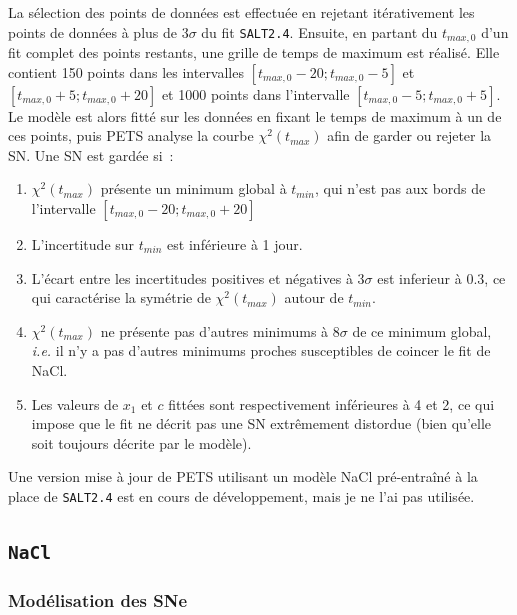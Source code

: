 \documentclass{book}
\def\nacl{\texttt{NaCl}\xspace}
\def\saltd{\texttt{SALT2.4}\xspace}
\begin{document}
La sélection des points de données est effectuée en rejetant itérativement les points de données à plus de 3$\sigma$ du fit \saltd. Ensuite, en partant du $t_{max, 0}$ d'un fit complet des points restants, une grille de temps de maximum est réalisé. Elle contient 150 points dans les intervalles $[t_{max, 0} - 20 ; t_{max, 0} - 5]$ et $[t_{max, 0} +5; t_{max, 0} + 20]$ et 1000 points dans l'intervalle $[t_{max, 0} - 5 ; t_{max, 0} + 5]$. Le modèle est alors fitté sur les données en fixant le temps de maximum à un de ces points, puis PETS analyse la courbe $\chi^2(t_{max})$ afin de garder ou rejeter la SN. Une SN est gardée si~:
\begin{enumerate}
\item $\chi^2(t_{max})$ présente un minimum global à $t_{min}$, qui n'est pas aux bords de l'intervalle $[t_{max,0} - 20 ; t_{max, 0} + 20]$
\item L'incertitude sur $t_{min}$ est inférieure à 1 jour.
\item L'écart entre les incertitudes positives et négatives à 3$\sigma$ est inferieur à $0.3$, ce qui caractérise la symétrie de $\chi^2(t_{max})$ autour de $t_{min}$.
\item $\chi^2(t_{max})$ ne présente pas d'autres minimums à 8$\sigma$ de ce minimum global, \textit{i.e.} il n'y a pas d'autres minimums proches susceptibles de coincer le fit de NaCl.
\item Les valeurs de $x_1$ et $c$ fittées sont respectivement inférieures à 4 et 2, ce qui impose que le fit ne décrit pas une SN extrêmement distordue (bien qu'elle soit toujours décrite par le modèle).
\end{enumerate}

Une version mise à jour de PETS utilisant un modèle NaCl pré-entraîné à la place de \saltd est en cours de développement, mais je ne l'ai pas utilisée.


\subsection{\nacl}
\label{anx:nacl}

\subsubsection{Modélisation des SNe}
\end{document}
